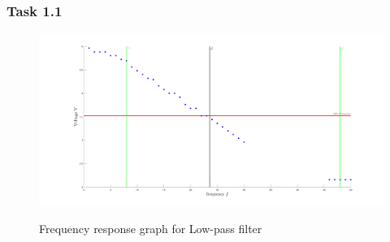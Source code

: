 \documentclass{article}
\begin{document}
\subsubsection{Task 1.1}
\begin{figure}[!ht]
  \caption{Frequency response graph for Low-pass filter}
  \includegraphics[width=\textwidth]{LPF.png}
  \label{fig:task-1-1}
\end{figure}
\end{document}
